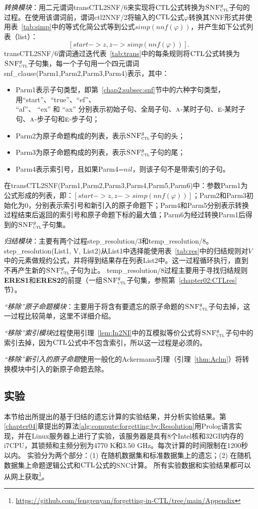 {\em 转换模块}：用二元谓词transCTL2SNF/6来实现将$\textrm{CTL}$公式转换为${\textsc{SNF}_{\textsc{ctl}}^g}$子句的过程。在使用该谓词前，谓词ctl2NNF/2将输入的$\textrm{CTL}$公式$\varphi$转换其NNF形式并使用表~\ref{tab:simp}中的等式化简公式等到公式$simp(nnf(\varphi))$，并产生如下公式列表（list）：
$$[start-> z, z -> simp(nnf(\varphi))].$$
transCTL2SNF/6谓词通过迭代表~\ref{tab:trans}中的每条规则将$\textrm{CTL}$公式转换为${\textsc{SNF}_{\textsc{ctl}}^g}$子句集，每一个子句用一个四元谓词snf\_clause(Parm1,Parm2,Parm3,Parm4)表示，其中：
\begin{itemize}
	\item Parm1表示子句类型，即第~\ref{chap2:subsec:snf}节中的六种字句类型，用“start”、“true”、“ef”、\\“af”、 “ex” 和 “ax” 分别表示初始子句、全局子句、$\textsc{a}$-某时子句、$\textsc{e}$-某时子句、$\textsc{a}$-步子句和$\textsc{e}$-步子句；
	\item Parm2为原子命题构成的列表，表示${\textsc{SNF}_{\textsc{ctl}}^g}$子句的头；
	\item Parm3为原子命题构成的列表，表示${\textsc{SNF}_{\textsc{ctl}}^g}$子句的尾；
	\item Parm4表示索引号，且如果Parm4=$nil$，则该子句不是带索引的子句。
\end{itemize}

在transCTL2SNF(Parm1,Parm2,Parm3,Parm4,Parm5,Parm6)中：参数Parm1为公式形成的列表，即：$[start-> z, z -> simp(nnf(\varphi))]$；Parm2和Parm3初始化为0，分别表示索引号和新引入的原子命题下；Parm4和Parm5分别表示转换过程结束后返回的索引号和原子命题下标的最大值；Parm6为经过转换Parm1后得到的${\textsc{SNF}_{\textsc{ctl}}^g}$子句集。


{\em 归结模块}：主要有两个过程step\_resolution/3和temp\_resolution/8。step\_resolution(List1, V, List2)从List1中选择能使用表~\ref{tab:res}中的归结规则对$V$中的元素做规约公式，并将得到结果存在列表List2中。这一过程循环执行，直到不再产生新的${\textsc{SNF}_{\textsc{ctl}}^g}$子句为止。
temp\_resolution/8过程主要用于寻找归结规则\textbf{ERES1}和\textbf{ERES2}的前提（一组${\textsc{SNF}_{\textsc{ctl}}^g}$子句集，参照第~\ref{chapter02:CTLres}节）。

{\em “移除”原子命题模块}：主要用于将含有要遗忘的原子命题的${\textsc{SNF}_{\textsc{ctl}}^g}$子句去掉，这一过程比较简单，这里不详细介绍。

{\em “移除”索引模块}过程使用引理~\ref{lem:In2NI}中的互模拟等价公式将${\textsc{SNF}_{\textsc{ctl}}^g}$子句中的索引去掉，因为$\textrm{CTL}$公式中不包含索引，所以这一过程是必须的。

{\em “移除”新引入的原子命题}使用一般化的Ackermann引理（引理~\ref{thm:Aclm}）将转换模块中引入的新原子命题去除。


\subsection{实验}\label{cha5:subsec:expriment}
 本节给出所提出的基于归结的遗忘计算的实验结果，并分析实验结果。第\ref{chapter04}章提出的算法\ref{alg:compute:forgetting:by:Resolution}用Prolog语言实现，并在Linux服务器上进行了实验，该服务器是具有8个Intel核和32GB内存的i7CPU，其锁频和主频分别为4770 K和3.50 GHz。每次计算的时间限制在1200秒以内。
	实验分为两个部分：(1) 在随机数据集和标准数据集上的遗忘；(2) 在随机数据集上命题逻辑公式和$\textrm{CTL}$公式的SNC计算。
	所有实验数据和实验结果都可以从网上获取\footnote{ \url{https://github.com/fengrenyan/forgetting-in-CTL/tree/main/Appendix}}。
	
